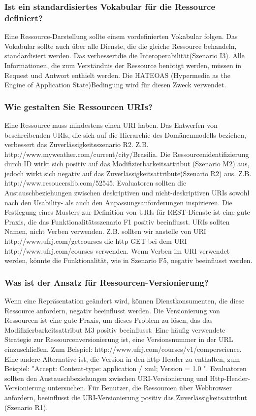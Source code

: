 \documentclass{acmsiggraph}
\begin{document}
\subsubsection{Ist ein standardisiertes Vokabular für die Ressource definiert?}
Eine Ressource-Darstellung sollte einem vordefinierten Vokabular folgen.
Das Vokabular sollte auch über alle Dienste, die die gleiche Ressource behandeln, standardisiert werden.
Das verbessertdie die Interoperabilität(Szenario I3). Alle Informationen, die zum Verständnis der Ressource benötigt werden, müssen in Request und Antwort enthielt werden. Die HATEOAS (Hypermedia as the Engine of Application State)Bedingung wird für diesen Zweck verwendet.
\subsubsection{Wie gestalten Sie Ressourcen URIs?}
Eine Ressource muss mindestens einen URI haben.
Das Entwerfen von beschreibenden URIs, die sich auf die Hierarchie des Domänenmodells beziehen, verbessert das Zuverlässigkeitsszenario R2.
Z.B. http://www.myweather.com/current/city/Brasilia.
Die Ressourcenidentifizierung durch ID wirkt sich positiv auf das Modifizierbarkeitsattribut (Szenario M2) aus, jedoch wirkt sich negativ auf das Zuverlässigkeitsattribute(Szenario R2) aus. Z.B. http://www.resoucerslib.com/52545.
Evaluatoren sollten die  Austauschbeziehungen zwischen deskriptiven und nicht-deskriptiven URIs sowohl nach den Usability- als auch den Anpassungsanforderungen inspizieren. Die Festlegung eines Musters zur Definition von URIs für REST-Dienste ist eine gute Praxis, die das Funktionalitätsszenario F1 positiv beeinflusst.
URIs sollten Namen, nicht Verben verwenden.
Z.B. sollten wir anstelle von URI http://www.ufrj.com/getcourses die http GET bei dem URI http://www.ufrj.com/courses verwenden. Wenn Verben im URI verwendet werden, könnte die Funktionalität, wie in Szenario F5, negativ beeinflusst werden.
\subsubsection{Was ist der Ansatz für Ressourcen-Versionierung?}
Wenn eine Repräsentation geändert wird, können Dienstkonsumenten, die diese Ressource anfordern, negativ beeinflusst werden. Die Versionierung von Ressourcen ist eine gute Praxis, um dieses Problem zu lösen, das das Modifizierbarkeitsattribut M3 positiv beeinflusst.
Eine häufig verwendete Strategie zur Ressourcenversionierung ist, eine Versionsnummer in der URL einzuschließen. Zum Beispiel: http://www.ufrj.com/courses/v1/comperscience.
Eine andere Alternative ist, die Version in den http-Header zu enthalten, zum Beispiel: "Accept: Content-type: application / xml; Version = 1.0 ". 
Evaluatoren sollten den Austauschbeziehungen zwischen URI-Versionierung und Http-Header-Versionierung untersuchen.
Für Benutzer, die Ressourcen über Webbrowser anfordern, beeinflusst die URI-Versionierung positiv das Zuverlässigkeitsattribut (Szenario R1).
\end{document}
